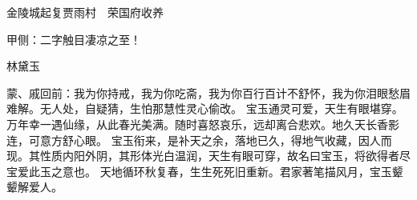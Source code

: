 
\begin{parag}
    金陵城起复贾雨村　荣国府收养\begin{note}甲侧：二字触目凄凉之至！\end{note}林黛玉
\end{parag}

\begin{parag}
    \begin{note}蒙、戚回前：我为你持戒，我为你吃斋，我为你百行百计不舒怀，我为你泪眼愁眉难解。无人处，自疑猜，生怕那慧性灵心偷改。
        宝玉通灵可爱，天生有眼堪穿。万年幸一遇仙缘，从此春光美满。随时喜怒哀乐，远却离合悲欢。地久天长香影连，可意方舒心眼。
        宝玉衔来，是补天之余，落地已久，得地气收藏，因人而现。其性质内阳外阴，其形体光白温润，天生有眼可穿，故名曰宝玉，将欲得者尽宝爱此玉之意也。
        天地循环秋复春，生生死死旧重新。君家著笔描风月，宝玉颦颦解爱人。\end{note}
\end{parag}


